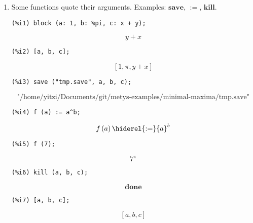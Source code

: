 \documentclass[12pt,leqno]{article}
\begin{document}
\begin{enumerate}
\item Some functions quote their arguments.
Examples: $\mathbf{save}$, $\mathbf{:=}$, $\mathbf{kill}$.
\begin{verbatim}
(%i1) block (a: 1, b: %pi, c: x + y);
\end{verbatim}
\begin{dmath}[number={\(\mathop{\mathrm{\%o}_{1}}\)}]
y+x
\end{dmath}
\begin{verbatim}
(%i2) [a, b, c];
\end{verbatim}
\begin{dmath}[number={\(\mathop{\mathrm{\%o}_{2}}\)}]
\left[1, \pi, y+x\right]
\end{dmath}
\begin{verbatim}
(%i3) save ("tmp.save", a, b, c);
\end{verbatim}
\begin{dmath}[number={\(\mathop{\mathrm{\%o}_{3}}\)}]
\text{"/home/yitzi/Documents/git/metys-examples/minimal-maxima/tmp.save"}
\end{dmath}
\begin{verbatim}
(%i4) f (a) := a^b;
\end{verbatim}
\begin{dmath}[number={\(\mathop{\mathrm{\%o}_{4}}\)}]
f\left(a\right) \hiderel{:=} {a}^{b}
\end{dmath}
\begin{verbatim}
(%i5) f (7);
\end{verbatim}
\begin{dmath}[number={\(\mathop{\mathrm{\%o}_{5}}\)}]
{7}^{\pi}
\end{dmath}
\begin{verbatim}
(%i6) kill (a, b, c);
\end{verbatim}
\begin{dmath}[number={\(\mathop{\mathrm{\%o}_{6}}\)}]
\mathop{\mathbf{done}}
\end{dmath}
\begin{verbatim}
(%i7) [a, b, c];
\end{verbatim}
\begin{dmath}[number={\(\mathop{\mathrm{\%o}_{7}}\)}]
\left[a, b, c\right]
\end{dmath}



\end{enumerate}
\end{document}
